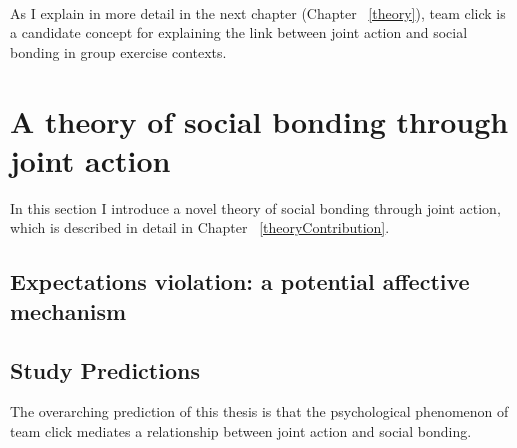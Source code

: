 \begin{CJK}{UTF8}{gbsn}
\noindent{}

\\
\\
\\


As I explain in more detail in the next chapter (Chapter ~\ref{theory}), team click is a candidate concept for explaining the link between joint action and social bonding in group exercise contexts.












\section{A theory of social bonding through joint action}

In this section I introduce a novel theory of social bonding through joint action, which is described in detail in Chapter ~\ref{theoryContribution}.

  \subsection{Expectations violation: a potential affective mechanism}


\subsection{Study Predictions}


    The overarching prediction of this thesis is that the psychological phenomenon of team click mediates a relationship between joint action and social bonding.


\end{CJK}
